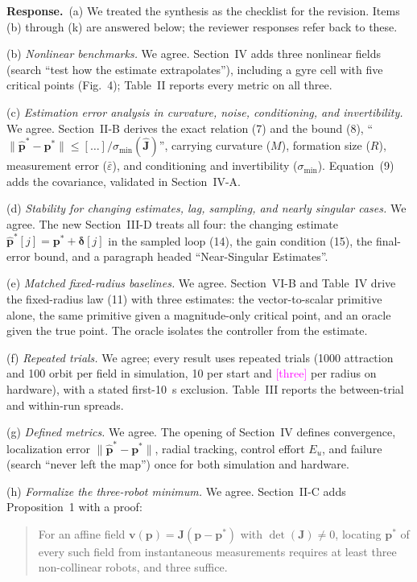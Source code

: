 \documentclass[10pt]{article}
\newcommand{\rev}[1]{#1}                             %
\newcommand{\open}[1]{\textcolor{magenta}{[#1]}}     %
\newcommand{\resp}{\par\textbf{Response.}~}
\newenvironment{newtext}{\begin{quote}\small\sloppy}{\end{quote}}
\begin{document}
\resp (a) We treated the synthesis as the checklist for the revision. Items (b) through (k) are answered below; the reviewer responses refer back to these.

(b) \emph{Nonlinear benchmarks.} We agree. Section~IV adds three nonlinear fields (search ``test how the estimate extrapolates''), including a gyre cell with five critical points (Fig.~4); Table~II reports every metric on all three.

(c) \emph{Estimation error analysis in curvature, noise, conditioning, and invertibility.} We agree. Section~II-B derives the exact relation (7) and the bound (8), ``$\|\hat{\mathbf{p}}^* - \mathbf{p}^*\| \le [\ldots]/\sigma_{\min}(\hat{\mathbf{J}})$'', carrying curvature ($M$), formation size ($R$), measurement error ($\bar\varepsilon$), and conditioning and invertibility ($\sigma_{\min}$). Equation~(9) adds the covariance, validated in Section~IV-A.

(d) \emph{Stability for changing estimates, lag, sampling, and nearly singular cases.} We agree. The new Section~III-D treats all four: the changing estimate $\hat{\mathbf{p}}^*[j] = \mathbf{p}^* + \boldsymbol\delta[j]$ in the sampled loop (14), the gain condition (15), the final-error bound, and a paragraph headed ``Near-Singular Estimates''.

(e) \emph{Matched fixed-radius baselines.} We agree. Section~VI-B and Table~IV drive the fixed-radius law (11) with three estimates: the vector-to-scalar primitive alone, the same primitive given a magnitude-only critical point, and an oracle given the true point. The oracle isolates the controller from the estimate.

(f) \emph{Repeated trials.} We agree; every result uses repeated trials (1000 attraction and \rev{100} orbit per field in simulation, 10 per start and \open{three} per radius on hardware), with a stated first-10~s exclusion. Table~III reports the between-trial and within-run spreads.

(g) \emph{Defined metrics.} We agree. The opening of Section~IV defines convergence, localization error $\|\hat{\mathbf{p}}^* - \mathbf{p}^*\|$, radial tracking, control effort $E_u$, and failure (search ``never left the map'') once for both simulation and hardware.

(h) \emph{Formalize the three-robot minimum.} We agree. Section~II-C adds Proposition~1 with a proof:
\begin{newtext}
For an affine field $\mathbf{v}(\mathbf{p}) = \mathbf{J}(\mathbf{p}-\mathbf{p}^*)$ with $\det(\mathbf{J}) \neq 0$, locating $\mathbf{p}^*$ of every such field from instantaneous measurements requires at least three non-collinear robots, and three suffice.
\end{newtext}
\end{document}
